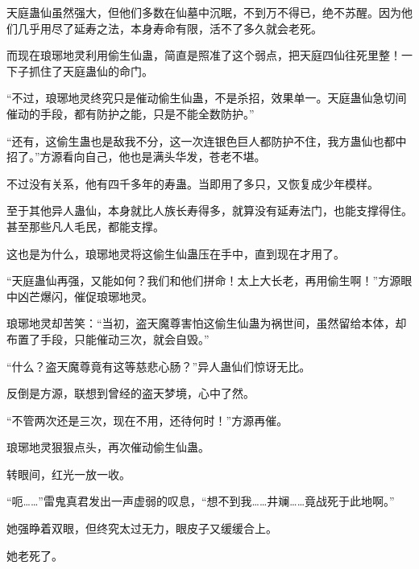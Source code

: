 \begin{this_body}
天庭蛊仙虽然强大，但他们多数在仙墓中沉眠，不到万不得已，绝不苏醒。因为他们几乎用尽了延寿之法，本身寿命有限，活不了多久就会老死。

而现在琅琊地灵利用偷生仙蛊，简直是照准了这个弱点，把天庭四仙往死里整！一下子抓住了天庭蛊仙的命门。

“不过，琅琊地灵终究只是催动偷生仙蛊，不是杀招，效果单一。天庭蛊仙急切间催动的手段，都有防护之能，只是不能全数防护。”

“还有，这偷生蛊也是敌我不分，这一次连银色巨人都防护不住，我方蛊仙也都中招了。”方源看向自己，他也是满头华发，苍老不堪。

不过没有关系，他有四千多年的寿蛊。当即用了多只，又恢复成少年模样。

至于其他异人蛊仙，本身就比人族长寿得多，就算没有延寿法门，也能支撑得住。甚至那些凡人毛民，都能支撑。

这也是为什么，琅琊地灵将这偷生仙蛊压在手中，直到现在才用了。

“天庭蛊仙再强，又能如何？我们和他们拼命！太上大长老，再用偷生啊！”方源眼中凶芒爆闪，催促琅琊地灵。

琅琊地灵却苦笑：“当初，盗天魔尊害怕这偷生仙蛊为祸世间，虽然留给本体，却布置了手段，只能催动三次，就会自毁。”

“什么？盗天魔尊竟有这等慈悲心肠？”异人蛊仙们惊讶无比。

反倒是方源，联想到曾经的盗天梦境，心中了然。

“不管两次还是三次，现在不用，还待何时！”方源再催。

琅琊地灵狠狠点头，再次催动偷生仙蛊。

转眼间，红光一放一收。

“呃……”雷鬼真君发出一声虚弱的叹息，“想不到我……井斓……竟战死于此地啊。”

她强睁着双眼，但终究太过无力，眼皮子又缓缓合上。

她老死了。

\end{this_body}

